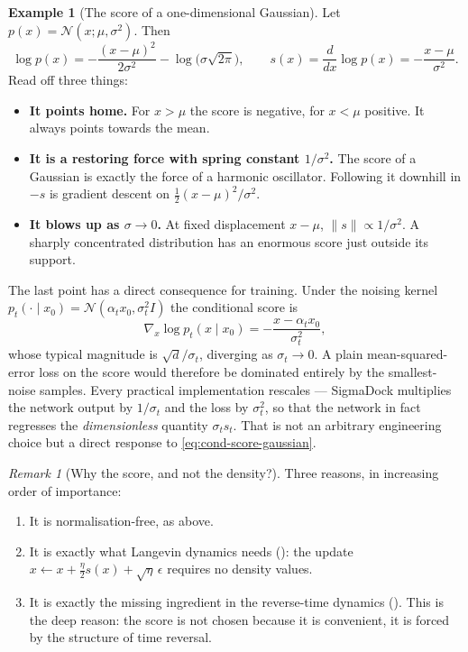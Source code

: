 \documentclass[11pt,a4paper]{report}
\theoremstyle{definition}
\newtheorem{example}[example]{Example}
\theoremstyle{remark}
\newtheorem{remark}[remark]{Remark}
\begin{document}
\begin{example}[The score of a one-dimensional Gaussian]
\label{ex:score-gaussian-1d}
Let $p(x)=\mathcal N(x;\mu,\sigma^2)$. Then
\[
\log p(x) = -\frac{(x-\mu)^2}{2\sigma^2} - \log\bigl(\sigma\sqrt{2\pi}\bigr),
\qquad
s(x) = \frac{d}{dx}\log p(x) = -\frac{x-\mu}{\sigma^2}.
\]
Read off three things:
\begin{itemize}
\item \textbf{It points home.} For $x>\mu$ the score is negative, for
      $x<\mu$ positive. It always points towards the mean.
\item \textbf{It is a restoring force with spring constant $1/\sigma^2$.}
      The score of a Gaussian is exactly the force of a harmonic
      oscillator. Following it downhill in $-s$ is gradient descent on
      $\tfrac12(x-\mu)^2/\sigma^2$.
\item \textbf{It blows up as $\sigma\to0$.} At fixed displacement
      $x-\mu$, $\|s\|\propto1/\sigma^2$. A sharply concentrated distribution
      has an enormous score just outside its support.
\end{itemize}
The last point has a direct consequence for training. Under the noising
kernel $p_t(\cdot\mid x_0)=\mathcal N(\alpha_tx_0,\sigma_t^2I)$ the
conditional score is
\begin{equation}
\label{eq:cond-score-gaussian}
\nabla_x\log p_t(x\mid x_0) = -\frac{x-\alpha_tx_0}{\sigma_t^2},
\end{equation}
whose typical magnitude is $\sqrt d/\sigma_t$, diverging as $\sigma_t\to0$.
A plain mean-squared-error loss on the score would therefore be dominated
entirely by the smallest-noise samples. Every practical implementation
rescales --- SigmaDock multiplies the network output by $1/\sigma_t$ and the
loss by $\sigma_t^2$, so that the network in fact regresses the
\emph{dimensionless} quantity $\sigma_ts_t$. That is not an arbitrary
engineering choice but a direct response to \eqref{eq:cond-score-gaussian}.
\end{example}

\begin{remark}[Why the score, and not the density?]
\label{rem:why-score}
Three reasons, in increasing order of importance:
\begin{enumerate}
\item It is normalisation-free, as above.
\item It is exactly what Langevin dynamics needs
      (): the update $x\leftarrow x+\tfrac{\eta}{2}s(x)
      +\sqrt\eta\,\epsilon$ requires no density values.
\item It is exactly the missing ingredient in the reverse-time dynamics
      (). This is the deep reason: the score is
      not chosen because it is convenient, it is forced by the structure of
      time reversal.
\end{enumerate}
\end{remark}
\end{document}
